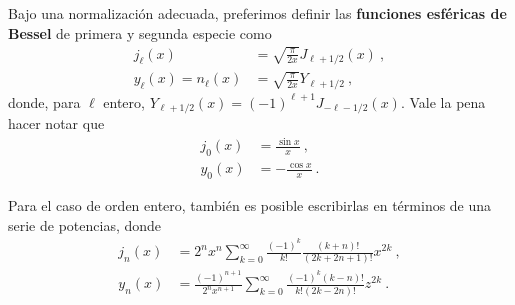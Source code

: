 Bajo una normalización adecuada, preferimos definir las \textbf{funciones esféricas de Bessel} de primera y segunda especie como
\begin{align}
    j_\ell (x) & = \sqrt{\frac{\pi}{2x}} J_{\ell + 1/2}(x) \ , \\
    y_\ell (x) = n_\ell(x) & = \sqrt{\frac{\pi}{2x}} Y_{\ell + 1/2} \ ,
\end{align}
donde, para $\ell$ entero, $Y_{\ell + 1/2}(x) = (-1)^{\ell + 1}J_{-\ell - 1/2}(x)$. Vale la pena hacer notar que
\begin{align}
    j_0(x) & = \frac{\sin x}{x} \ , \\
    y_0(x) & = - \frac{\cos x}{x} \ .
\end{align}

Para el caso de orden entero, también es posible escribirlas en términos de una serie de potencias, donde
\begin{align}
    j_n(x) & = 2^n x^n  \sum_{k=0}^\infty \frac{(-1)^k}{k!} \frac{(k+n)!}{(2k+2n+1)!}x^{2k} \ , \\
    y_n(x) & = \frac{(-1)^{n+1}}{2^n x^{n+1}} \sum_{k = 0}^\infty \frac{(-1)^k (k-n)!}{k! (2k-2n)!}z^{2k} \ .
\end{align}

